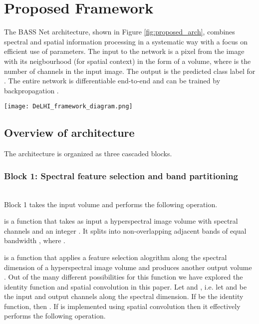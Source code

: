 \documentclass[journal]{IEEEtran}
\begin{document}
\section{Proposed Framework}
\label{sec:framework}

The BASS Net architecture, shown in Figure \ref{fig:proposed_arch}, combines spectral and spatial information processing in a systematic way with a focus on efficient use of parameters. The input to the network is a pixel  from the image with its  neigbourhood (for spatial context) in the form of a  volume, where  is the number of channels in the input image. The output is the predicted class label  for . The entire network is differentiable end-to-end and can be trained by backpropagation \cite{Rumelhart:1989}. 

\begin{figure*}
\centering
	\texttt{[image: DeLHI\_framework\_diagram.png]}
	\caption{Block diagram of the BASS Net architecture.}
	\label{fig:proposed_arch}
\end{figure*}

\subsection{Overview of architecture}
The architecture is organized as three cascaded blocks.\\

\subsubsection{Block 1: Spectral feature selection and band partitioning}\hfill \\

Block 1 takes the input  volume  and performs the following operation.



\noindent  is a function that takes as input a hyperspectral image volume  with  spectral channels and an integer . It splits  into  non-overlapping adjacent bands  of equal bandwidth , where .


\noindent  is a function that applies a feature selection alogrithm along the spectral dimension of a  hyperspectral image volume  and produces another  output volume . Out of the many different possibilities for this function we have explored the identity function  and  spatial convolution in this paper. Let  and , i.e. let  and  be the input and output channels along the spectral dimension. If  be the identity function, then . If  is implemented using  spatial convolution then it effectively performs the following operation.
\end{document}
